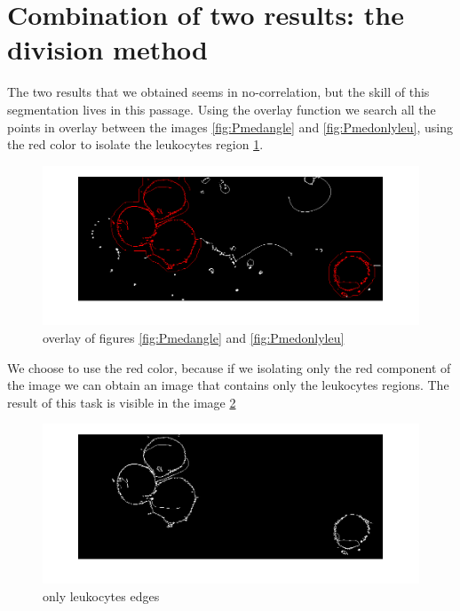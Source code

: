 \section{Combination of two results: the division method}
The two results that we obtained seems in no-correlation, but the skill of this segmentation lives in this passage. Using the overlay function we search all the points in overlay between the images \ref{fig:Pmedangle} and \ref{fig:Pmedonlyleu}, using the red color to isolate the leukocytes region \ref{fig:over}.
\begin{figure}
	\begin{center}
		\centering
		\includegraphics[scale=0.5]{img/overlay.png}
		\caption{overlay of figures \ref{fig:Pmedangle} and \ref{fig:Pmedonlyleu}}
		\label{fig:over}
	\end{center}
\end{figure}
We choose to use the red color, because if we isolating only the red component of the image we can obtain an image that contains only the leukocytes regions. The result of this task is visible in the image \ref{fig:leukoover} 
\begin{figure}
	\begin{center}
		\centering
		\includegraphics[scale=0.5]{img/overLeuko.png}
		\caption{only leukocytes edges}
		\label{fig:leukoover}
	\end{center}
\end{figure}

